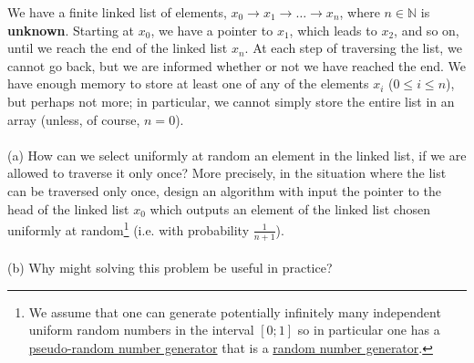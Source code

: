 \begin{problem}
    We have a finite linked list of elements, \( x_{0} \rightarrow x_{1} \rightarrow \ldots \rightarrow x_{n} \), where \( n \in \mathbb{N} \) is \textbf{unknown}. Starting at \( x_{0} \), we have a pointer to \( x_{1} \), which leads to \( x_{2} \), and so on, until we reach the end of the linked list \( x_{n} \). At each step of traversing the list, we cannot go back, but we are informed whether or not we have reached the end. We have enough memory to store at least one of any of the elements \( x_i \) (\( 0 \leq i \leq n \)), but perhaps not more; in particular, we cannot simply store the entire list in an array (unless, of course, \( n = 0 \)).
    \\\\
    (a) How can we select uniformly at random an element in the linked list, if we are allowed to traverse it only once? More precisely, in the situation where the list can be traversed only once, design an algorithm with input the pointer to the head of the linked list \( x_0 \) which outputs an element of the linked list chosen uniformly at random\footnote{We assume that one can generate potentially infinitely many independent uniform random numbers in the interval \( \left[0;1\right] \) so in particular one has a \href{https://en.wikipedia.org/wiki/Pseudorandom_number_generator}{pseudo-random number generator} that is a \href{https://en.wikipedia.org/wiki/Random_number_generation}{random number generator}.} (i.e. with probability \( \frac{1}{n+1} \)).
    \\\\
    (b) Why might solving this problem be useful in practice?
\end{problem}
